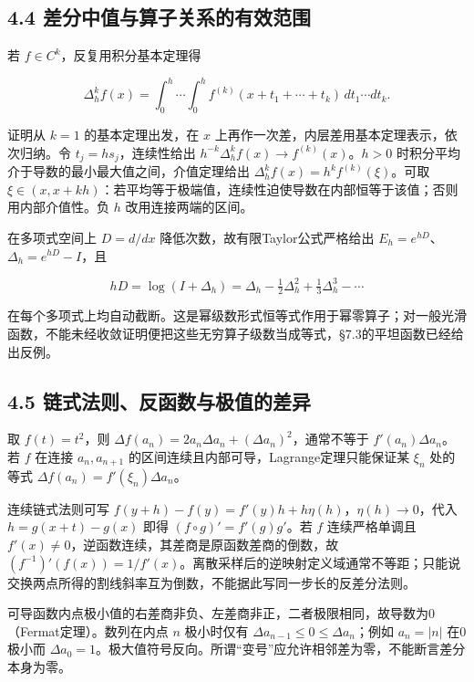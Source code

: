 \documentclass[11pt,a4paper]{article}
\begin{document}
\subsection{4.4
差分中值与算子关系的有效范围}\label{ux5deeux5206ux4e2dux503cux4e0eux7b97ux5b50ux5173ux7cfbux7684ux6709ux6548ux8303ux56f4}

若 \(f\in C^k\)，反复用积分基本定理得

\[
\Delta_h^kf(x)=\int_0^h\!\cdots\!\int_0^h
f^{(k)}(x+t_1+\cdots+t_k)\,dt_1\cdots dt_k.\tag{4.4}
\]

证明从 \(k=1\) 的基本定理出发，在 \(x\)
上再作一次差，内层差用基本定理表示，依次归纳。令
\(t_j=hs_j\)，连续性给出 \(h^{-k}\Delta_h^kf(x)\to f^{(k)}(x)\)。\(h>0\)
时积分平均介于导数的最小最大值之间，介值定理给出
\(\Delta_h^kf(x)=h^kf^{(k)}(\xi)\)。可取
\(\xi\in(x,x+kh)\)：若平均等于极端值，连续性迫使导数在内部恒等于该值；否则用内部介值性。负
\(h\) 改用连接两端的区间。

在多项式空间上 \(D=d/dx\) 降低次数，故有限Taylor公式严格给出
\(E_h=e^{hD}\)、\(\Delta_h=e^{hD}-I\)，且

\[
hD=\log(I+\Delta_h)
=\Delta_h-\tfrac12\Delta_h^2+\tfrac13\Delta_h^3-\cdots
\]

在每个多项式上均自动截断。这是幂级数形式恒等式作用于幂零算子；对一般光滑函数，不能未经收敛证明便把这些无穷算子级数当成等式，§7.3的平坦函数已经给出反例。

\subsection{4.5
链式法则、反函数与极值的差异}\label{ux94feux5f0fux6cd5ux5219ux53cdux51fdux6570ux4e0eux6781ux503cux7684ux5deeux5f02}

取 \(f(t)=t^2\)，则
\(\Delta f(a_n)=2a_n\Delta a_n+(\Delta a_n)^2\)，通常不等于
\(f'(a_n)\Delta a_n\)。若 \(f\) 在连接 \(a_n,a_{n+1}\)
的区间连续且内部可导，Lagrange定理只能保证某 \(\xi_n\) 处的等式
\(\Delta f(a_n)=f'(\xi_n)\Delta a_n\)。

连续链式法则可写 \(f(y+h)-f(y)=f'(y)h+h\eta(h)\)，\(\eta(h)\to0\)，代入
\(h=g(x+t)-g(x)\) 即得 \((f\circ g)'=f'(g)g'\)。若 \(f\) 连续严格单调且
\(f'(x)\ne0\)，逆函数连续，其差商是原函数差商的倒数，故
\((f^{-1})'(f(x))=1/f'(x)\)。离散采样后的逆映射定义域通常不等距；只能说交换两点所得的割线斜率互为倒数，不能据此写同一步长的反差分法则。

可导函数内点极小值的右差商非负、左差商非正，二者极限相同，故导数为0（Fermat定理）。数列在内点
\(n\) 极小时仅有 \(\Delta a_{n-1}\le0\le\Delta a_n\)；例如 \(a_n=|n|\)
在0极小而
\(\Delta a_0=1\)。极大值符号反向。所谓``变号''应允许相邻差为零，不能断言差分本身为零。
\end{document}
